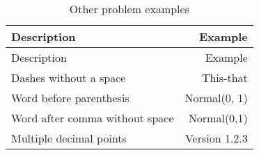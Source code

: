 \documentclass{article}
\begin{document}
\begin{longtable}[]{@{}lr@{}}
  \caption{\label{tab:problems}Other problem examples}\tabularnewline
  \toprule
  Description & Example \\
  \midrule
  \endfirsthead
  \toprule
  Description & Example \\
  \midrule
  \endhead
  Dashes without a space & This-that \\
  Word before parenthesis & Normal(0, 1) \\
  Word after comma without space & Normal(0,1) \\
  Multiple decimal points & Version 1.2.3 \\
  \bottomrule
\end{longtable}
\end{document}
